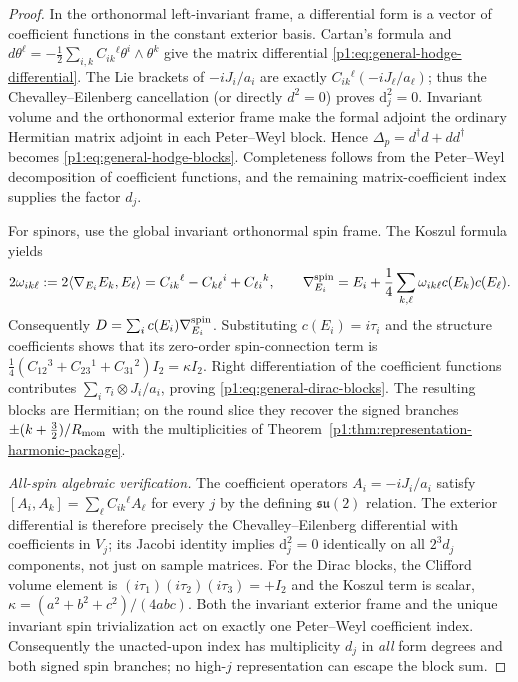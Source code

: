 \documentclass[11pt]{article}
\begin{document}
\begin{proof}
In the orthonormal left-invariant frame, a differential form is a vector
of coefficient functions in the constant exterior basis.  Cartan's
formula and
$d\theta^\ell=-\tfrac12\sum_{i,k}C_{ik}{}^\ell
 \theta^i\wedge\theta^k$
give the matrix differential \eqref{p1:eq:general-hodge-differential}.
The Lie brackets of $-iJ_i/a_i$ are exactly $C_{ik}{}^\ell(-iJ_\ell/a_\ell)$;
thus the Chevalley--Eilenberg cancellation (or directly $d^2=0$)
proves $\mathrm{d}_j^2=0$.  Invariant volume and the orthonormal
exterior frame make the formal adjoint the ordinary Hermitian matrix
adjoint in each Peter--Weyl block.  Hence
$\Delta_p=d^\dagger d+dd^\dagger$ becomes
\eqref{p1:eq:general-hodge-blocks}.  Completeness follows from the
Peter--Weyl decomposition of coefficient functions, and the remaining
matrix-coefficient index supplies the factor $d_j$.

For spinors, use the global invariant orthonormal spin frame.
The Koszul formula yields
\[
 2\omega_{ik\ell}
 :=2\langle\nabla_{E_i}E_k,E_\ell\rangle
   =C_{ik}{}^\ell-C_{k\ell}{}^i+C_{\ell i}{}^k,
 \qquad
 \nabla_{E_i}^{\rm spin}
   =E_i+\frac14\sum_{k,\ell}\omega_{ik\ell}
          c(E_k)c(E_\ell).
\]
Consequently $D=\sum_i c(E_i)\nabla_{E_i}^{\rm spin}$.
Substituting $c(E_i)=i\tau_i$ and the structure coefficients shows
that its zero-order spin-connection term is
$\tfrac14(C_{12}{}^3+C_{23}{}^1+C_{31}{}^2)I_2=\kappa I_2$.
Right differentiation of the coefficient functions contributes
$\sum_i\tau_i\otimes J_i/a_i$, proving
\eqref{p1:eq:general-dirac-blocks}.  The resulting blocks are Hermitian;
on the round slice they recover the signed branches
$\pm(k+\tfrac32)/R_{\mathrm{mom}}$ with the multiplicities of
Theorem~\ref{p1:thm:representation-harmonic-package}.

\emph{All-spin algebraic verification.}  The coefficient operators
$A_i=-iJ_i/a_i$ satisfy
$[A_i,A_k]=\sum_\ell C_{ik}{}^\ell A_\ell$
for every $j$ by the defining $\mathfrak{su}(2)$ relation.
The exterior differential is therefore precisely the
Chevalley--Eilenberg differential with coefficients in $V_j$;
its Jacobi identity implies $\mathrm{d}_j^2=0$ identically on all
$2^3d_j$ components, not just on sample matrices.
For the Dirac blocks, the Clifford volume element is
$(i\tau_1)(i\tau_2)(i\tau_3)=+I_2$ and the Koszul term is scalar,
$\kappa=(a^2+b^2+c^2)/(4abc)$.  Both the invariant exterior frame
and the unique invariant spin trivialization act on exactly one
Peter--Weyl coefficient index.  Consequently the unacted-upon index
has multiplicity $d_j$ in \emph{all} form degrees and both signed
spin branches; no high-$j$ representation can escape the block sum.

\end{proof}
\end{document}
